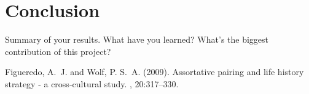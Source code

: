 \documentclass[twoside]{article}
\begin{document}
\section{Conclusion}

Summary of your results. What have you learned? What’s the biggest contribution of this project?\\

\lipsum[5] %



\begin{thebibliography}{99} %

Figueredo, A.~J. and Wolf, P. S.~A. (2009).
\newblock Assortative pairing and life history strategy - a cross-cultural
  study.
, 20:317--330.
 
\end{thebibliography}

\end{document}

